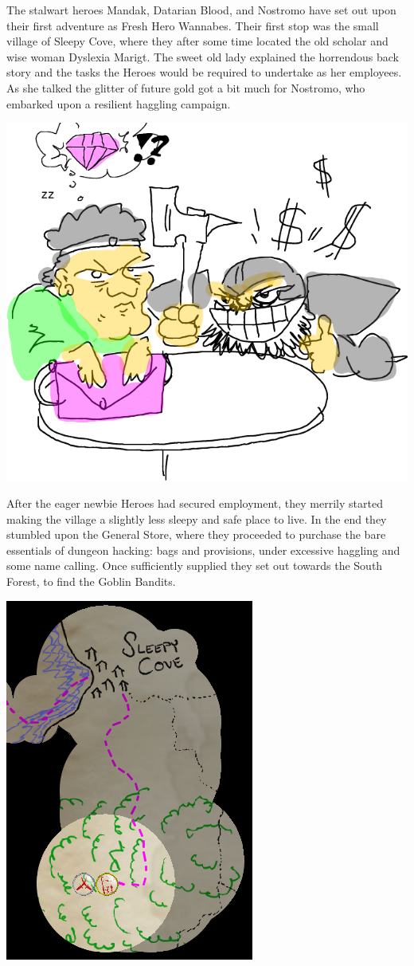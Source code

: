 The stalwart heroes Mandak, Datarian Blood, and Nostromo have set out upon their first adventure as Fresh Hero Wannabes. Their first stop was the small village of Sleepy Cove, where they after some time located the old scholar and wise woman Dyslexia Marigt. The sweet old lady explained the horrendous back story and the tasks the Heroes would be required to undertake as her employees. As she talked the glitter of future gold got a bit much for Nostromo, who embarked upon a resilient haggling campaign.

\begin{center}
\vspace{0.5 cm}
\includegraphics[width=0.7\linewidth]{./figs/playthrough/negotiate.png}
\vspace{0.5 cm}
\end{center}

After the eager newbie Heroes had secured employment, they merrily started making the village a slightly less sleepy and safe place to live. In the end they stumbled upon the General Store, where they proceeded to purchase the bare essentials of dungeon hacking: bags and provisions, under excessive haggling and some name calling. Once sufficiently supplied they set out towards the South Forest, to find the Goblin Bandits.

\begin{center}
\vspace{0.5 cm}
\includegraphics[width=0.4\linewidth]{./figs/playthrough/travel-goblins.png}
\vspace{0.5 cm}
\end{center}

